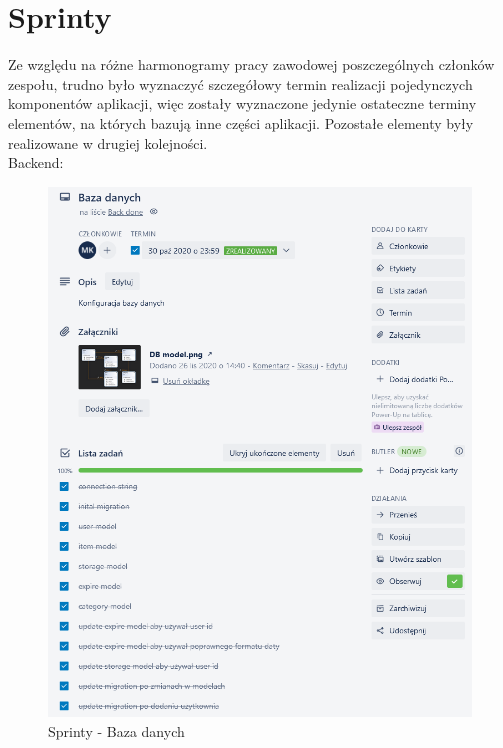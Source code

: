 \documentclass[12pt,a4paper]{article}
\begin{document}
	\newpage

	\section{Sprinty}
		\indent Ze względu na różne harmonogramy pracy zawodowej poszczególnych członków zespołu, trudno było wyznaczyć szczegółowy termin realizacji pojedynczych komponentów aplikacji,
		więc zostały wyznaczone jedynie ostateczne terminy elementów, na których bazują inne części aplikacji. Pozostałe elementy były realizowane w drugiej kolejności.\\
		\indent Backend:
		\begin{figure}[H]
			\centering
			\includegraphics[width=\textwidth]{img/DBSprint.png}
			\caption{Sprinty - Baza danych}
			\label{fig:sprint-db}
		\end{figure}
\end{document}
